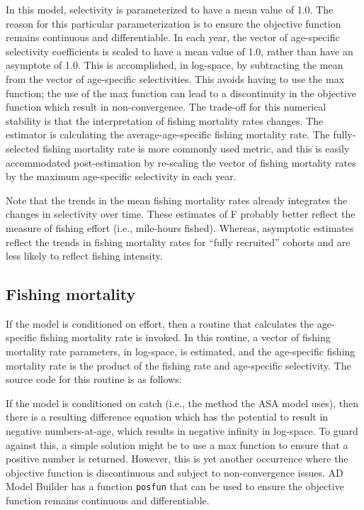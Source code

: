\documentclass[12pt,letterpaper]{article}
\begin{document}
      In this model,  selectivity is parameterized to have a mean value of 1.0.  The reason for this particular parameterization is to ensure the objective function remains continuous and differentiable.  In each year, the vector of age-specific selectivity coefficients is scaled to have a mean value of 1.0, rather than have an asymptote of 1.0.  This is accomplished, in log-space, by subtracting the mean from the vector of age-specific selectivities.  This avoids having to use the max function; the use of the max function can lead to a discontinuity in the objective function which result in non-convergence.  The trade-off for this numerical stability is that the interpretation of fishing mortality rates changes.  The estimator is calculating the average-age-specific fishing mortality rate.  The fully-selected fishing mortality rate is more commonly used metric, and this is easily accommodated post-estimation by re-scaling the vector of fishing mortality rates by the maximum age-specific selectivity in each year. 

      Note that the trends in the mean fishing mortality rates already integrates the changes in selectivity over time. These estimates of F probably better reflect the measure of fishing effort (i.e., mile-hours fished). Whereas, asymptotic estimates reflect the trends in fishing mortality rates for ``fully recruited'' cohorts and are less likely to reflect fishing intensity.


  \subsection{Fishing mortality} %
  \label{sub:fishing_mortality}
  If the model is conditioned on effort, then a routine that calculates the age-specific fishing mortality rate is invoked.  In this routine, a vector of fishing mortality rate parameters, in log-space, is estimated, and the age-specific fishing mortality rate is the product of the fishing rate and age-specific selectivity.  The source code for this routine is as follows:
  

  If the model is conditioned on catch (i.e., the method the ASA model uses), then there is a resulting difference equation which has the potential to result in negative numbers-at-age, which results in negative infinity in log-space.  To guard against this, a simple solution might be to use a max function to ensure that a positive number is returned. However, this is yet another occurrence where the objective function is discontinuous and subject to non-convergence issues.  AD Model Builder has a function \texttt{posfun} that can be used to ensure the objective function remains continuous and differentiable.
\end{document}
